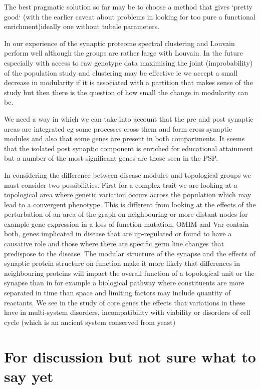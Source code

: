 The best pragmatic solution so far may be to choose a method that gives `pretty good` (with the earlier caveat about problems in looking for too pure a functional enrichment)ideally one without tubale parameters. 

In our experience of the synaptic proteome spectral clustering and Louvain perform well although the groups are rather large with Louvain. In the future especially with access to raw genotype data maximising the joint (improbability) of the population study and clustering may be effective ie we accept a small decrease in modularity if it is associated with a partition that makes sense of the study but then there is the question of how small the change in modularity can be. 



We need a way in which we can take into account that the pre and post synaptic areas are integrated eg some processes cross them and form cross synaptic modules and also that some genes are present in both compartments. It seems that the isolated post synaptic component is enriched for educational attainment but a number of the most significant genes are those seen in the PSP.

In considering the difference between disease modules and topological groups we must consider two possibilities. First for a complex trait we are looking at a topological area where genetic variation occurs across the population which may lead to a convergent phenotype. This is different from looking at the effects of the perturbation of an area of the graph on neighbouring or more distant nodes for example gene expression in a loss of function mutation. OMIM and Var contain both, genes implicated in disease that are up-regulated or found to have a causative role and those where there are specific germ line changes that predispose to the disease. The modular structure of the synapse and the effects of synaptic protein structure on function make it more likely that differences in neighbouring proteins will impact the overall function of a topological unit or the synapse than in for example a biological pathway where constituents are more separated in time than space and limiting factors may include quantity of reactants. We see in the study of core genes the effects that variations in these have in multi-system disorders, incompatibility with viability or disorders of cell cycle (which is an ancient system conserved from yeast)

\section{For discussion but not sure what to say yet}

